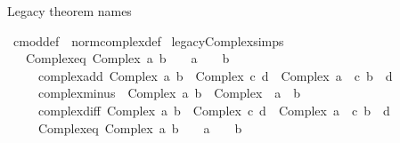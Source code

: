 \begin{isabellebody}
%
\endisatagproof
{\isafoldproof}%
%
\isadelimproof
%
\endisadelimproof
%
\begin{isamarkuptext}%
Legacy theorem names%
\end{isamarkuptext}\isamarkuptrue%
\isamarkupfalse%
\ cmod{\isacharunderscore}{\kern0pt}def\ {\isacharequal}{\kern0pt}\ norm{\isacharunderscore}{\kern0pt}complex{\isacharunderscore}{\kern0pt}def\isanewline
\isanewline
{}\isamarkupfalse%
\ legacy{\isacharunderscore}{\kern0pt}Complex{\isacharunderscore}{\kern0pt}simps{\isacharcolon}{\kern0pt}\isanewline
\ \ \ Complex{\isacharunderscore}{\kern0pt}eq{\isacharunderscore}{\kern0pt}{}{\isacharcolon}{\kern0pt}\ {\isachardoublequoteopen}Complex\ a\ b\ {\isacharequal}{\kern0pt}\ {}\ {\isasymlongleftrightarrow}\ a\ {\isacharequal}{\kern0pt}\ {}\ {\isasymand}\ b\ {\isacharequal}{\kern0pt}\ {}{\isachardoublequoteclose}\isanewline
\ \ \ \ \ complex{\isacharunderscore}{\kern0pt}add{\isacharcolon}{\kern0pt}\ {\isachardoublequoteopen}Complex\ a\ b\ {\isacharplus}{\kern0pt}\ Complex\ c\ d\ {\isacharequal}{\kern0pt}\ Complex\ {\isacharparenleft}{\kern0pt}a\ {\isacharplus}{\kern0pt}\ c{\isacharparenright}{\kern0pt}\ {\isacharparenleft}{\kern0pt}b\ {\isacharplus}{\kern0pt}\ d{\isacharparenright}{\kern0pt}{\isachardoublequoteclose}\isanewline
\ \ \ \ \ complex{\isacharunderscore}{\kern0pt}minus{\isacharcolon}{\kern0pt}\ {\isachardoublequoteopen}{\isacharminus}{\kern0pt}\ {\isacharparenleft}{\kern0pt}Complex\ a\ b{\isacharparenright}{\kern0pt}\ {\isacharequal}{\kern0pt}\ Complex\ {\isacharparenleft}{\kern0pt}{\isacharminus}{\kern0pt}\ a{\isacharparenright}{\kern0pt}\ {\isacharparenleft}{\kern0pt}{\isacharminus}{\kern0pt}\ b{\isacharparenright}{\kern0pt}{\isachardoublequoteclose}\isanewline
\ \ \ \ \ complex{\isacharunderscore}{\kern0pt}diff{\isacharcolon}{\kern0pt}\ {\isachardoublequoteopen}Complex\ a\ b\ {\isacharminus}{\kern0pt}\ Complex\ c\ d\ {\isacharequal}{\kern0pt}\ Complex\ {\isacharparenleft}{\kern0pt}a\ {\isacharminus}{\kern0pt}\ c{\isacharparenright}{\kern0pt}\ {\isacharparenleft}{\kern0pt}b\ {\isacharminus}{\kern0pt}\ d{\isacharparenright}{\kern0pt}{\isachardoublequoteclose}\isanewline
\ \ \ \ \ Complex{\isacharunderscore}{\kern0pt}eq{\isacharunderscore}{\kern0pt}{}{\isacharcolon}{\kern0pt}\ {\isachardoublequoteopen}Complex\ a\ b\ {\isacharequal}{\kern0pt}\ {}\ {\isasymlongleftrightarrow}\ a\ {\isacharequal}{\kern0pt}\ {}\ {\isasymand}\ b\ {\isacharequal}{\kern0pt}\ {}{\isachardoublequoteclose}\isanewline

\end{isabellebody}

